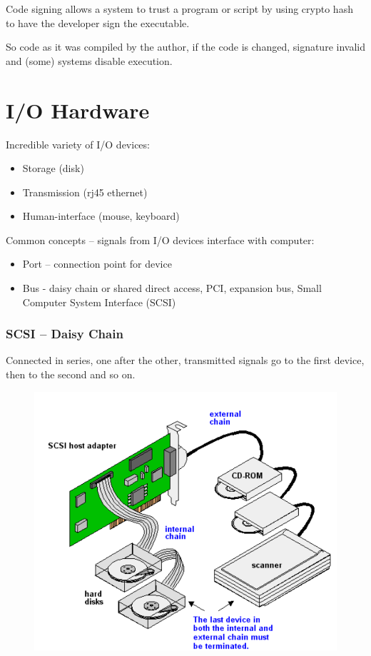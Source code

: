 Code signing allows a system to trust a program or script by using
crypto hash to have the developer sign the executable.

So code as it was compiled by the author, if the code is changed, signature invalid and (some) systems
disable execution.


\chapter{I/O Hardware}

Incredible variety of I/O devices:

\begin{itemize}
    \item Storage (disk)
    \item Transmission (rj45 ethernet)
    \item Human-interface (mouse, keyboard)
\end{itemize}


Common concepts – signals from I/O devices interface with computer:

\begin{itemize}
    \item Port – connection point for device
    \item Bus - daisy chain or shared direct access, PCI, expansion bus, Small Computer System Interface (SCSI)
\end{itemize}

\subsection{SCSI – Daisy Chain}

Connected in series, one after the other, transmitted signals go to the first device, then to the
second and so on. 

\begin{figure}[h!]
    \centering
    \includegraphics[width=0.45\linewidth]{img/sdvvdsdvsdsv.png}
\end{figure}


